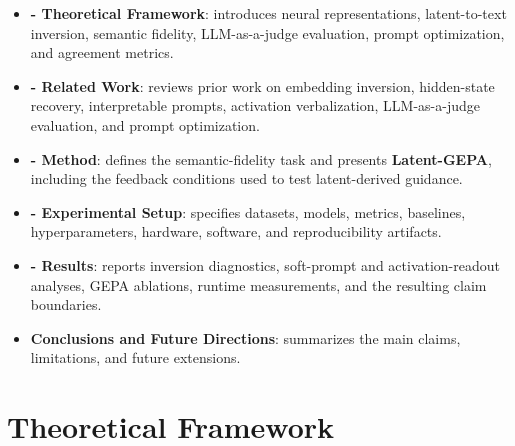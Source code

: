 \documentclass[12pt,a4paper,twoside,openright]{book}
\begin{document}
\begin{itemize}
    \item \textbf{ - Theoretical Framework}: introduces neural
    representations, latent-to-text inversion, semantic fidelity,
    LLM-as-a-judge evaluation, prompt optimization, and agreement metrics.

    \item \textbf{ - Related Work}: reviews prior work on
    embedding inversion, hidden-state recovery, interpretable prompts,
    activation verbalization, LLM-as-a-judge evaluation, and prompt optimization.

    \item \textbf{ - Method}: defines the semantic-fidelity task and
    presents \textbf{Latent-GEPA}, including the feedback conditions used to test
    latent-derived guidance.

    \item \textbf{ - Experimental Setup}: specifies
    datasets, models, metrics, baselines, hyperparameters, hardware, software,
    and reproducibility artifacts.

    \item \textbf{ - Results}: reports inversion diagnostics,
    soft-prompt and activation-readout analyses, GEPA ablations, runtime
    measurements, and the resulting claim boundaries.

    \item \textbf{Conclusions and Future Directions}: summarizes the main claims,
    limitations, and future extensions.
\end{itemize}

\newpage

\tableofcontents

\newpage

\listoffigures

\newpage

\listoftables

\mainmatter

\pagestyle{fancy}
\fancyhead[LO]{\nouppercase{\rightmark}}
\fancyhead[RE]{\nouppercase{\leftmark}}
\fancyhead[LE,RO]{\thepage}
\fancyfoot{}

\chapter{Theoretical Framework}
\label{chapter:theory}
\end{document}
